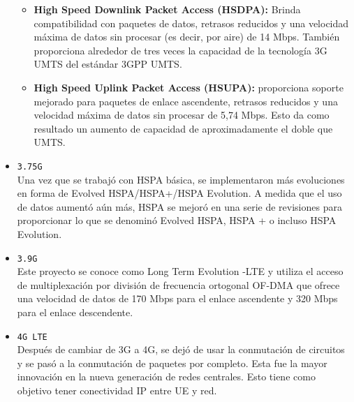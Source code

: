 \begin{itemize}
\begin{itemize}
\item \textbf{High Speed Downlink Packet Access (HSDPA):} Brinda compatibilidad con paquetes de datos, retrasos reducidos y una velocidad máxima de datos sin procesar (es decir, por aire) de 14 Mbps. También proporciona alrededor de tres veces la capacidad de la tecnología 3G UMTS del estándar 3GPP UMTS. 
\item \textbf{High Speed Uplink Packet Access (HSUPA):} proporciona soporte mejorado para paquetes de enlace ascendente, retrasos reducidos y una velocidad máxima de datos sin procesar de 5,74 Mbps. Esto da como resultado un aumento de capacidad de aproximadamente el doble que UMTS.
\end{itemize}	
	
	\item {\color{red}\texttt{3.75G}}\\
	Una vez que se trabajó con HSPA básica, se implementaron más evoluciones en forma de Evolved HSPA/HSPA+/HSPA Evolution. A medida que el uso de datos aumentó aún más, HSPA se mejoró en una serie de revisiones para proporcionar lo que se denominó Evolved HSPA, HSPA + o incluso HSPA Evolution. 
	\item {\color{red}\texttt{3.9G}}\\
	Este proyecto se conoce como Long Term Evolution -LTE y utiliza el acceso de multiplexación por división de frecuencia ortogonal OF-DMA que ofrece una velocidad de datos de 170 Mbps para el enlace ascendente y 320 Mbps para el enlace descendente.
	\item {\color{red}\texttt{4G LTE}}\\
	Después de cambiar de 3G a 4G, se dejó de usar la conmutación de circuitos y se pasó a la conmutación de paquetes por completo. Esta fue la mayor innovación en la nueva generación de redes centrales. Esto tiene como objetivo tener conectividad IP entre UE y red.
	

\end{itemize}
